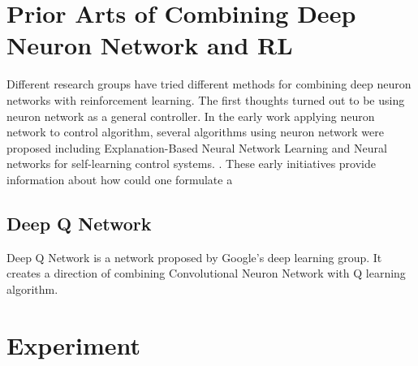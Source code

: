 \documentclass[officiallayout]{tktla}
\begin{document}
\chapter{Prior Arts of Combining Deep Neuron Network and RL}
Different research groups have tried different methods for combining deep neuron networks with reinforcement learning. The first thoughts turned out to be using neuron network as a general controller. In the early work applying neuron network to control algorithm, several algorithms using neuron network were proposed including Explanation-Based Neural Network Learning\cite{thrun1996explanation} and Neural networks for self-learning control systems. \cite{nguyen1990neural}. These early initiatives provide information about how could one formulate a 
\section{Deep Q Network}
Deep Q Network is a network proposed by Google's deep learning group. It creates a direction of combining Convolutional Neuron Network with Q learning algorithm\cite{mnih2013playing}\cite{mnih2015human}. 




\chapter{Experiment}
\end{document}
